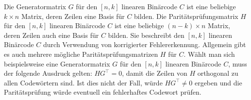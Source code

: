 \begin{definition}
    Die Generatormatrix $G$ für den $[n,k]$ linearen Binärcode $C$ ist eine beliebige $k \times n$ Matrix, deren Zeilen eine Basis für $C$ bilden.
    Die Paritätsprüfungsmatrix $H$ für den $[n,k]$ linearen Binärcode $C$ ist eine beliebige $(n-k) \times n$ Matrix, deren Zeilen auch eine Basis für $C$ bilden. Sie beschreibt den $[n,k]$ linearen Binärcode $C$ durch Verwendung von korrigierter Fehlererkennung. Allgemein gibt es auch mehrere mögliche Paritätsprüfungsmatrizen $H$ für $C$.
    Wählt man sich beispielsweise eine Generatormatrix $G$ für den $[n,k]$ linearen Binärcode $C$, muss der folgende Ausdruck gelten: $HG^\intercal = 0$, damit die Zeilen von $H$ orthogonal zu allen Codewörtern sind. Ist dies nicht der Fall, würde $HG^\intercal \neq 0$ ergeben und die Paritätsprüfung würde eventuell ein fehlerhaftes Codewort prüfen. \cite[S. 4]{huffman}
\end{definition} 
    
    
    

